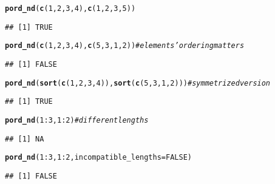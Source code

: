 \documentclass[11pt]{article}\usepackage[]{graphicx}\usepackage[]{color}
\makeatletter
\newcommand{\hlnum}[1]{\textcolor[rgb]{0.686,0.059,0.569}{#1}}%
\newcommand{\hlcom}[1]{\textcolor[rgb]{0.678,0.584,0.686}{\textit{#1}}}%
\newcommand{\hlopt}[1]{\textcolor[rgb]{0,0,0}{#1}}%
\newcommand{\hlstd}[1]{\textcolor[rgb]{0.345,0.345,0.345}{#1}}%
\newcommand{\hlkwc}[1]{\textcolor[rgb]{0.333,0.667,0.333}{#1}}%
\newcommand{\hlkwd}[1]{\textcolor[rgb]{0.737,0.353,0.396}{\textbf{#1}}}%
\newenvironment{kframe}{%
 \def\at@end@of@kframe{}%
 \ifinner\ifhmode%
  \def\at@end@of@kframe{\end{minipage}}%
  \begin{minipage}{\columnwidth}%
 \fi\fi%
 \def\FrameCommand##1{\hskip\@totalleftmargin \hskip-\fboxsep
 \colorbox{shadecolor}{##1}\hskip-\fboxsep
     \hskip-\linewidth \hskip-\@totalleftmargin \hskip\columnwidth}%
 \MakeFramed {\advance\hsize-\width
   \@totalleftmargin\z@ \linewidth\hsize
   \@setminipage}}%
 {\par\unskip\endMakeFramed%
 \at@end@of@kframe}
\newenvironment{knitrout}{}{} %
\newcommand{\Rfunc}[1]{\texttt{\hlkwd{#1}}}
\theoremstyle{remark}
\theoremstyle{definition}
\makeatother
\begin{document}
\begin{knitrout}\small
{}\color{fgcolor}\begin{kframe}
\begin{alltt}
\hlkwd{pord_nd}\hlstd{(}\hlkwd{c}\hlstd{(}\hlnum{1}\hlstd{,}\hlnum{2}\hlstd{,}\hlnum{3}\hlstd{,}\hlnum{4}\hlstd{),} \hlkwd{c}\hlstd{(}\hlnum{1}\hlstd{,}\hlnum{2}\hlstd{,}\hlnum{3}\hlstd{,}\hlnum{5}\hlstd{))}
\end{alltt}
\begin{verbatim}
## [1] TRUE
\end{verbatim}
\begin{alltt}
\hlkwd{pord_nd}\hlstd{(}\hlkwd{c}\hlstd{(}\hlnum{1}\hlstd{,}\hlnum{2}\hlstd{,}\hlnum{3}\hlstd{,}\hlnum{4}\hlstd{),} \hlkwd{c}\hlstd{(}\hlnum{5}\hlstd{,}\hlnum{3}\hlstd{,}\hlnum{1}\hlstd{,}\hlnum{2}\hlstd{))} \hlcom{# elements' ordering matters}
\end{alltt}
\begin{verbatim}
## [1] FALSE
\end{verbatim}
\begin{alltt}
\hlkwd{pord_nd}\hlstd{(}\hlkwd{sort}\hlstd{(}\hlkwd{c}\hlstd{(}\hlnum{1}\hlstd{,}\hlnum{2}\hlstd{,}\hlnum{3}\hlstd{,}\hlnum{4}\hlstd{)),} \hlkwd{sort}\hlstd{(}\hlkwd{c}\hlstd{(}\hlnum{5}\hlstd{,}\hlnum{3}\hlstd{,}\hlnum{1}\hlstd{,}\hlnum{2}\hlstd{)))} \hlcom{# symmetrized version}
\end{alltt}
\begin{verbatim}
## [1] TRUE
\end{verbatim}
\begin{alltt}
\hlkwd{pord_nd}\hlstd{(}\hlnum{1}\hlopt{:}\hlnum{3}\hlstd{,} \hlnum{1}\hlopt{:}\hlnum{2}\hlstd{)} \hlcom{# different lengths}
\end{alltt}
\begin{verbatim}
## [1] NA
\end{verbatim}
\begin{alltt}
\hlkwd{pord_nd}\hlstd{(}\hlnum{1}\hlopt{:}\hlnum{3}\hlstd{,} \hlnum{1}\hlopt{:}\hlnum{2}\hlstd{,} \hlkwc{incompatible_lengths}\hlstd{=}\hlnum{FALSE}\hlstd{)}
\end{alltt}
\begin{verbatim}
## [1] FALSE
\end{verbatim}
\end{kframe}
\end{knitrout}



\end{document}
